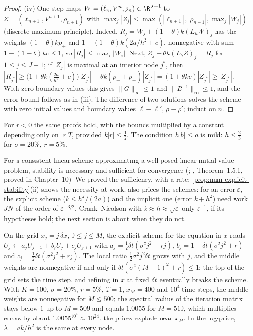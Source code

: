 \begin{proof}
(iv) One step maps $W=(\ell_n,V^n,\rho_n)\in\R^{J+1}$ to $Z=(\ell_{n+1},V^{n+1},\rho_{n+1})$ with
$\max_j|Z_j|\le\max(|\ell_{n+1}|,|\rho_{n+1}|,\max_j|W_j|)$ (discrete maximum principle). Indeed,
$R_j=W_j+(1-\theta)k(L_hW)_j$ has the weights $(1-\theta)kp_\pm$ and $1-(1-\theta)k(2a/h^2+c)$, nonnegative
with sum $1-(1-\theta)kc\le1$, so $|R_j|\le\max_i|W_i|$. Next, $Z_j-\theta k(L_hZ)_j=R_j$ for $1\le j\le J-1$; if
$|Z_j|$ is maximal at an interior node $j^*$, then
$|R_{j^*}|\ge\big(1+\theta k(\frac{2a}{h^2}+c)\big)|Z_{j^*}|-\theta k(p_-+p_+)|Z_{j^*}|=(1+\theta kc)|Z_{j^*}|\ge|Z_{j^*}|$.
With zero boundary values this gives $\|G\|_\infty\le1$ and $\|B^{-1}\|_\infty\le1$, and the error bound follows
as in (iii). The difference of two solutions solves the scheme with zero initial values and boundary
values $\ell-\ell'$, $\rho-\rho'$; induct on $n$.
\end{proof}

For $r<0$ the same proofs hold, with the bounds multiplied by a constant depending only on $|r|T$,
provided $k|r|\le\frac12$. The condition $h|b|\le a$ is mild: $h\le\frac23$ for $\sigma=20\%$, $r=5\%$.

\begin{remark}\label{rem:num-lax}
For a consistent linear scheme approximating a well-posed linear initial-value problem, stability
is necessary and sufficient for convergence (\textcite{lax-richtmyer-1956};
\textcite{strikwerda-finite-difference}, Theorem~1.5.1, proved in Chapter~10). We proved the
sufficiency, with a rate; \cref{prop:num-explicit-stability}(ii) shows the necessity at work.
 also prices the schemes: for an error $\varepsilon$, the explicit scheme ($k\le h^2/(2a)$) and the
implicit one (error $k+h^2$) need work $JN$ of the order of $\varepsilon^{-3/2}$, Crank--Nicolson with
$k\approx h\approx\sqrt\varepsilon$ only $\varepsilon^{-1}$, if its hypotheses hold; the next section is about when they
do not.
\end{remark}

\begin{remark}\label{rem:num-s-grid}
On the grid $x_j=j\,\delta x$, $0\le j\le M$, the explicit scheme for the equation in $x$ reads
$U_j\leftarrow a_jU_{j-1}+b_jU_j+c_jU_{j+1}$ with $a_j=\frac12\delta t(\sigma^2j^2-rj)$, $b_j=1-\delta t(\sigma^2j^2+r)$ and
$c_j=\frac12\delta t(\sigma^2j^2+rj)$. The local ratio $\frac12\sigma^2j^2\delta t$ grows with $j$, and the middle weights
are nonnegative if and only if $\delta t(\sigma^2(M-1)^2+r)\le1$: the top of the grid sets the time step,
and refining in $x$ at fixed $\delta t$ eventually breaks the scheme. With $K=100$, $\sigma=20\%$, $r=5\%$,
$T=1$, $x_M=400$ and $10^4$ time steps, the middle weights are nonnegative for $M\le500$; the
spectral radius of the iteration matrix stays below $1$ up to $M=509$ and equals $1.0055$ for $M=510$,
which multiplies errors by about $1.0055^{10^4}\approx10^{24}$: the prices explode near $x_M$. In the
log-price, $\lambda=ak/h^2$ is the same at every node.
\end{remark}

